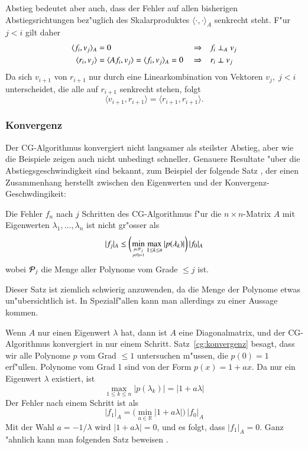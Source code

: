 Abstieg bedeutet aber auch, dass der Fehler auf allen bisherigen
Abstiegsrichtungen bez"uglich des Skalarproduktes
$\langle\cdot,\cdot\rangle_A$ senkrecht steht.
F"ur $j<i$ gilt daher
\begin{align}
\langle f_i,v_j\rangle_A&=0
&&\Rightarrow&
f_i&\perp_A v_j
\notag
\\
\langle r_i,v_j\rangle
&=\langle Af_i,v_j\rangle
=\langle f_i,v_j\rangle_A=0
&&\Rightarrow&
r_i&\perp v_j
\label{cg:rvperp}
\end{align}
Da sich $v_{i+1}$ von $r_{i+1}$ nur durch eine Linearkombination von Vektoren
$v_j,\;j < i$ unterscheidet, die alle auf $r_{i+1}$ senkrecht stehen, folgt
\[
\langle v_{i+1},r_{i+1}\rangle
=
\langle r_{i+1},r_{i+1}\rangle.
\]

\subsubsection{Konvergenz}
Der CG-Algorithmus konvergiert nicht langsamer als steilster Abstieg, aber
wie die Beispiele zeigen auch nicht unbedingt schneller.
Genauere Resultate "uber die Abstiegsgeschwindigkeit sind bekannt,
zum Beispiel der folgende Satz \cite[Theorem 8.9.9]{skript:watkins},
der einen Zusammenhang herstellt zwischen den Eigenwerten und der
Konvergenz-Geschwdingikeit:

\begin{satz}
\label{cg:konvergenz}
Die Fehler $f_n$ nach $j$ Schritten des CG-Algorithmus f"ur die
$n\times n$-Matrix $A$
mit Eigenwerten $\lambda_1,\dots,\lambda_n$ ist nicht gr"osser
als
\[
| f_j|_A
\le
\biggl(
\min_{{p\in{\cal P}_j}\atop{p(0)=1}}
\max_{1\le k\le n} |p(\lambda_k)|
\biggr)\,|f_0|_A
\]
wobei ${\cal P}_j$ die Menge aller Polynome vom Grade $\le j$ ist.
\end{satz}

Dieser Satz ist ziemlich schwierig anzuwenden, da die Menge der Polynome
etwas un"ubersichtlich ist.
In Spezialf"allen kann man allerdings zu einer Aussage kommen.

Wenn $A$ nur einen Eigenwert $\lambda$ hat, dann ist $A$ eine Diagonalmatrix,
und der CG-Algorithmus konvergiert in nur einem Schritt.
Satz~\ref{cg:konvergenz} besagt, dass wir alle Polynome $p$ vom Grad
$\le 1$ untersuchen m"ussen, die $p(0)=1$ erf"ullen.
Polynome vom Grad 1 sind von der Form $p(x)=1+ax$.
Da nur ein Eigenwert $\lambda$ existiert, ist 
\[
\max_{1\le k\le n}|p(\lambda_k)|=|1+a\lambda|
\]
Der Fehler nach einem Schritt ist als
\[
|f_1|_A=\bigl(\min_{a\in\mathbb R}|1+a\lambda|\bigr)\,|f_0|_A
\]
Mit der Wahl $a=-1/\lambda$ wird $|1+a\lambda|=0$, und es folgt, dass
$|f_1|_A=0$.
Ganz "ahnlich kann man folgenden Satz beweisen
\cite[Theorem 8.9.12]{skript:watkins}.

